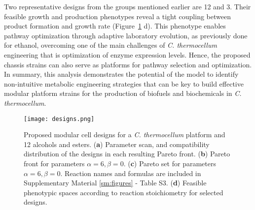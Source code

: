 Two representative designs from the groups mentioned earlier are 12 and 3.
Their feasible growth and production phenotypes reveal a tight coupling between product formation and growth rate (Figure~\ref{fig6:designs} d).
This phenotype enables pathway optimization through adaptive laboratory evolution, as previously done for ethanol,\citep{tian2016} overcoming one of the main challenges of \textit{C. thermocellum} engineering that is optimization of enzyme expression levels. Hence, the proposed chassis strains can also serve as platforms for pathway selection and optimization.
In summary, this analysis demonstrates the potential of the model to identify non-intuitive metabolic engineering strategies that can be key to build effective modular platform strains for the production of biofuels and biochemicals in \textit{C. thermocellum}.

\begin{figure}[hp]
    \centering
    \texttt{[image: designs.png]}
    \caption{Proposed modular cell designs for a \protect\textit{C. thermocellum} platform and 12 alcohols and esters. (\textbf{a}) Parameter scan, and compatibility distribution of the designs in each resulting Pareto front. (\textbf{b}) Pareto front for parameters $\alpha=6,\beta=0$. (\textbf{c}) Pareto set for parameters $\alpha=6,\beta=0$. Reaction names and formulas are included in Supplementary Material \ref{sm:figures} - Table S3. (\textbf{d}) Feasible phenotypic spaces according to reaction stoichiometry for selected designs.}
   \label{fig6:designs}
\end{figure}

